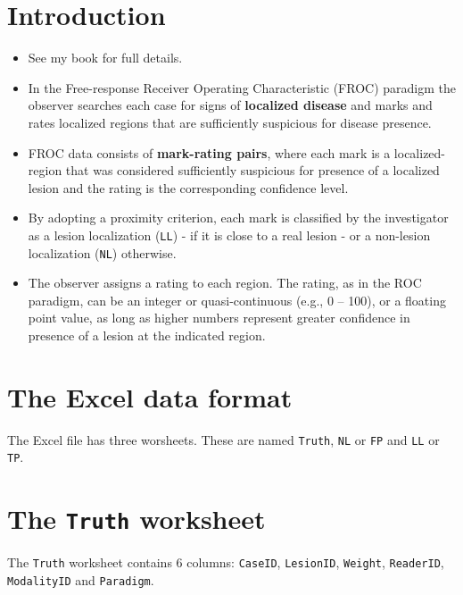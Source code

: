 \documentclass[]{book}
\providecommand{\tightlist}{%
  \setlength{\itemsep}{0pt}\setlength{\parskip}{0pt}}
\begin{document}
\hypertarget{introduction-1}{%
\section{Introduction}\label{introduction-1}}

\begin{itemize}
\tightlist
\item
  See my book \citet{RN2680} for full details.
\item
  In the Free-response Receiver Operating Characteristic (FROC) paradigm \citep{RN761} the observer searches each case for signs of \textbf{localized disease} and marks and rates localized regions that are sufficiently suspicious for disease presence.
\item
  FROC data consists of \textbf{mark-rating pairs}, where each mark is a localized-region that was considered sufficiently suspicious for presence of a localized lesion and the rating is the corresponding confidence level.
\item
  By adopting a proximity criterion, each mark is classified by the investigator as a lesion localization (\texttt{LL}) - if it is close to a real lesion - or a non-lesion localization (\texttt{NL}) otherwise.
\item
  The observer assigns a rating to each region. The rating, as in the ROC paradigm, can be an integer or quasi-continuous (e.g., 0 -- 100), or a floating point value, as long as higher numbers represent greater confidence in presence of a lesion at the indicated region.
\end{itemize}

\hypertarget{the-excel-data-format-1}{%
\section{The Excel data format}\label{the-excel-data-format-1}}

The Excel file has three worsheets. These are named \texttt{Truth}, \texttt{NL} or \texttt{FP} and \texttt{LL} or \texttt{TP}.

\hypertarget{the-truth-worksheet-1}{%
\section{\texorpdfstring{The \texttt{Truth} worksheet}{The Truth worksheet}}\label{the-truth-worksheet-1}}

The \texttt{Truth} worksheet contains 6 columns: \texttt{CaseID}, \texttt{LesionID}, \texttt{Weight}, \texttt{ReaderID}, \texttt{ModalityID} and \texttt{Paradigm}.
\end{document}
